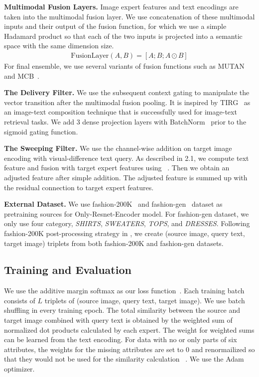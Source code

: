 \documentclass[10pt,twocolumn,letterpaper]{article}
\begin{document}
\textbf{Multimodal Fusion Layers.}
Image expert features and text encodings are taken into the multimodal fusion layer.
We use concatenation of these multimodal inputs and their output of the fusion function, for which we use a simple Hadamard product so that each of the two inputs is projected into a semantic space with the same dimension size.
\begin{align}
\label{eq:fusion}
   \text{FusionLayer}(A,B) = [A ;B ; A \odot B] \nonumber
\end{align}For final ensemble, we use several variants of fusion functions such as MUTAN~\cite{mutan-iccv-2017} and MCB~\cite{mcb-emnlp-2016}. 

\textbf{The Delivery Filter.}
We use the subsequent context gating to manipulate the vector transition after the multimodal fusion pooling. 
It is inspired by TIRG~\cite{vo-cvpr-2019} as an image-text composition technique that is successfully used for image-text retrieval tasks.
We add 3 dense projection layers with BatchNorm~\cite{Sergey-icml-2015} prior to the sigmoid gating function.

\textbf{The Sweeping Filter.}
We use the channel-wise addition on target image encoding with visual-difference text query.
As described in 2.1, we compute text feature and fusion with target expert features using ~\cite{mutan-iccv-2017}. Then we obtain an adjusted feature after simple addition. The adjusted feature is summed up with the residual connection to target expert features.



\textbf{External Dataset.}
We use fashion-200K~\cite{han-iccv-2017} and fashion-gen~\cite{arxiv-fashiongen-2018} dataset as pretraining sources for Only-Resnet-Encoder model.
For fashion-gen dataset, we only use four category, \textit{SHIRTS}, \textit{SWEATERS}, \textit{TOPS}, and \textit{DRESSES}.
Following fashion-200K post-processing strategy in \cite{vo-cvpr-2019}, we create (source image, query text, target image) triplets from both fashion-200K and fashion-gen datasets.


\subsection{Training and Evaluation}
We use the additive margin softmax as our loss function~\cite{amloss-arxiv-2019}.
Each training batch consists of $L$ triplets of (source image, query text, target image).
We use batch shuffling in every training epoch.
The total similarity between the source and target image combined with query text is obtained by the weighted sum of normalized dot products calculated by each expert. 
The weight for weighted sums can be learned from the text encoding. For data with no or only parts of six attributes, the weights for the missing attributes are set to 0 and renormailized so that they would not be used for the similarity calculation~ \cite{Liu-bmvc-2019}.
We use the Adam~\cite{kingma-iclr-2015} optimizer. 
\end{document}
